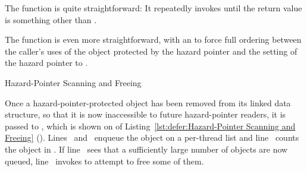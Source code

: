 \begin{fcvref}
\QuickQuizEnd

The  function is quite straightforward: It repeatedly
invokes  until the return value is something other
than .

\QuickQuizEnd

The  function is even more straightforward, with
an  to force full ordering between the caller's uses
of the object protected by the hazard pointer and the setting of
the hazard pointer to .
\end{fcvref}

\begin{listing}[tbp]

\caption{Hazard-Pointer Scanning and Freeing}
\label{lst:defer:Hazard-Pointer Scanning and Freeing}
\end{listing}

\begin{fcvref}
Once a hazard-pointer-protected object has been removed from its
linked data structure, so that it is now inaccessible to future
hazard-pointer readers, it is passed to ,
which is shown on  of
Listing~\ref{lst:defer:Hazard-Pointer Scanning and Freeing}
().
Lines~ and~
enqueue the object on a per-thread list 
and line~ counts the object in .
If line~ sees that a sufficiently large number of objects are now
queued, line~ invokes  to attempt to
free some of them.
\end{fcvref}

